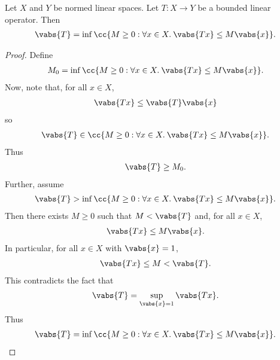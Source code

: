 \documentclass{article}
\begin{document}
\begin{claim*}[6]
  Let $X$ and $Y$ be normed linear spaces. Let $T:X\to Y$ be a bounded linear
  operator. Then
  \begin{align*}
    \vabs{T}=\inf\cc{M\geq 0 : \forall x\in X.\: \vabs{Tx}\leq M\vabs{x}}.
  \end{align*}
  \begin{proof}
    Define
    \begin{align*}
      M_0=\inf\cc{M\geq 0 : \forall x\in X.\: \vabs{Tx}\leq M\vabs{x}}.
    \end{align*}
    Now, note that, for all $x\in X$,
    \begin{align*}
      \vabs{Tx}\leq \vabs{T}\vabs{x}
    \end{align*}
    so
    \begin{align*}
      \vabs{T}\in \cc{M\geq 0 : \forall x\in X.\: \vabs{Tx}\leq M\vabs{x}}.
    \end{align*}
    Thus
    \begin{align*}
      \vabs{T}\geq M_0.
    \end{align*}
    Further, assume
    \begin{align*}
      \vabs{T}>\inf\cc{M\geq 0 : \forall x\in X.\: \vabs{Tx}\leq M\vabs{x}}.
    \end{align*}
    Then there exists $M\geq 0$ such that $M<\vabs{T}$ and, for all $x\in X$,
    \begin{align*}
      \vabs{Tx}\leq M\vabs{x}.
    \end{align*}
    In particular, for all $x\in X$ with $\vabs{x}=1$,
    \begin{align*}
      \vabs{Tx}\leq M < \vabs{T}.
    \end{align*}
    This contradicts the fact that
    \begin{align*}
      \vabs{T}=\sup_{\vabs{x}=1} \vabs{Tx}.
    \end{align*}
    Thus
    \begin{align*}
      \vabs{T}=\inf\cc{M\geq 0 : \forall x\in X.\: \vabs{Tx}\leq M\vabs{x}}.
    \end{align*}
  \end{proof}
\end{claim*}
\end{document}
